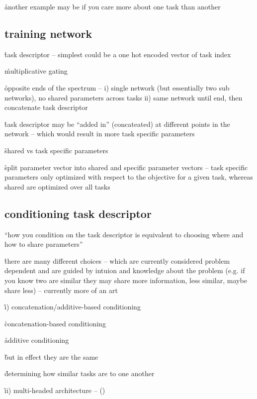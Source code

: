 \r{another example may be if you care more about one task than another}

\subsection{training network}

\r{task descriptor -- simplest could be a one hot encoded vector of task index}


\r{multiplicative gating}

\r{opposite ends of the spectrum -- i) single network (but essentially two sub networks), no shared parameters across tasks ii) same network until end, then concatenate task descriptor}


\r{task descriptor may be ``added in'' (concateated) at different points in the network -- which would result in more task specific parameters}


\r{shared vs task specific parameters}

\r{split parameter vector into shared and specific parameter vectors --  task specific parameters only optimized with respect to the objective for a given task, whereas shared are optimized over all tasks}

\subsection{conditioning task descriptor}

\r{``how you condition on the task descriptor is equivalent to choosing where and how to share parameters''}

\r{there are many different choices -- which are currently considered problem dependent and are guided by intuion and knowledge about the problem (e.g. if you know two are similar they may share more information, less similar, maybe share less) -- currently more of an art}

\r{i) concatenation/additive-based conditioning}

\r{concatenation-based conditioning}


\r{additive conditioning}


\r{but in effect they are the same}

\r{determining how similar tasks are to one another}

\r{ii) multi-headed architecture -- ()}

